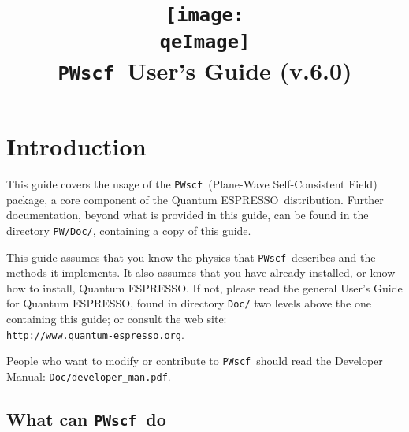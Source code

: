 \documentclass[12pt,a4paper]{article}
\def\version{6.0}
\def\PWscf{\texttt{PWscf}}
\def\qe{{\sc Quantum ESPRESSO}}
\begin{document}
 
\author{}
\date{}

\def\qeImage{../../Doc/quantum_espresso.pdf}

\title{
  \texttt{[image: \\qeImage]} \\
  \Huge \PWscf\ User's Guide (v.\version) 
}

\maketitle

\tableofcontents

\section{Introduction}

This guide covers the usage of the \PWscf\ 
(Plane-Wave Self-Consistent Field) package,
a core component of the \qe\ distribution.
Further documentation, beyond what is provided 
in this guide, can be found in the directory
\texttt{PW/Doc/}, containing a copy of this guide.

This guide assumes that you know the physics 
that \PWscf\ describes and the methods it implements.
It also assumes  that you have already installed,
or know how to install, \qe. If not, please read
the general User's Guide for \qe, found in 
directory \texttt{Doc/} two levels above the 
one containing this guide; or consult the web site:\\
\texttt{http://www.quantum-espresso.org}.

People who want to modify or contribute to 
\PWscf\ should read the Developer Manual: 
\texttt{Doc/developer\_man.pdf}.

\subsection{What can \PWscf\ do}
\end{document}

